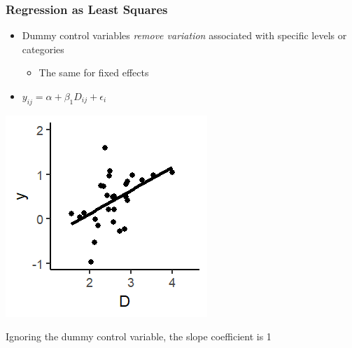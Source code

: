 \documentclass[xcolor=x11names,compress]{beamer}\usepackage[]{graphicx}\usepackage[]{color}
\makeatletter
\def\maxwidth{ %
  \ifdim\Gin@nat@width>\linewidth
    \linewidth
  \else
    \Gin@nat@width
  \fi
}
\newenvironment{knitrout}{}{} %
\renewcommand{\(}{\begin{columns}}
\renewcommand{\)}{\end{columns}}
\newcommand{\<}[1]{\begin{column}{#1}}
\renewcommand{\>}{\end{column}}
\makeatother
\begin{document}
\begin{frame}
\frametitle{Regression as Least Squares}
\begin{itemize}
\item Dummy control variables \textit{remove variation} associated with specific levels or categories
\begin{itemize}
\item The same for fixed effects
\end{itemize}
\item $y_{ij} = \alpha + \beta_1 D_{ij} + \epsilon_i$
\end{itemize}
\begin{multicols}{2}
\begin{knitrout}
\color{fgcolor}
\includegraphics[width=\maxwidth]{figure/graph_ols_FE1-1} 

\end{knitrout}
\columnbreak
Ignoring the dummy control variable, the slope coefficient is 1 
\end{multicols}
\end{frame}
\end{document}
